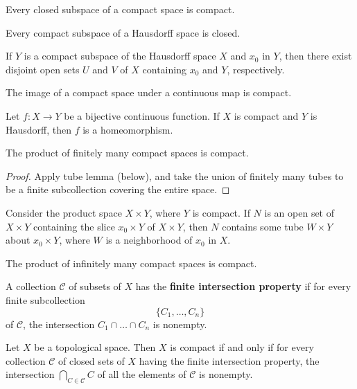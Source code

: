 \begin{theorem}
Every closed subspace of a compact space is compact.
\end{theorem}

\begin{theorem}
Every compact subspace of a Hausdorff space is closed.
\end{theorem}

\begin{lemma}
If $Y$ is a compact subspace of the Hausdorff space $X$ and $x_0$ in $Y$, then there exist disjoint open sets $U$ and $V$ of $X$ containing $x_0$ and $Y$, respectively. 
\end{lemma}

\begin{theorem}
The image of a compact space under a continuous map is compact.
\end{theorem}

\begin{theorem}
Let $f\colon X \rightarrow Y$ be a bijective continuous function. If $X$ is compact and $Y$ is Hausdorff, then $f$ is a homeomorphism.
\end{theorem}

\begin{theorem}
The product of finitely many compact spaces is compact.
\end{theorem}

\begin{proof}
Apply tube lemma (below), and take the union of finitely many tubes to be a finite subcollection covering the entire space.
\end{proof}

\begin{lemma}
Consider the product space $X \times Y$, where $Y$ is compact. If $N$ is an open set of $X \times Y$ containing the slice $x_0 \times Y$ of $X \times Y$, then $N$
contains some tube $W \times Y$ about $x_0 \times Y$, where $W$ is a neighborhood of $x_0$ in $X$.    
\end{lemma}

\begin{theorem}
The product of infinitely many compact spaces is compact.
\end{theorem}

\begin{definition}
A collection $\mathscr{C}$ of subsets of $X$ has the \textbf{finite intersection property} if for every finite subcollection 
\[
    \{ C_1, \dots, C_n \} 
\]
of $\mathscr{C}$, the intersection $C_1 \cap \dots \cap C_n$ is nonempty.
\end{definition}

\begin{theorem}
Let $X$ be a topological space. Then $X$ is compact if and only if for every collection $\mathscr{C}$ of closed sets of $X$ having the finite intersection property,
the intersection $\bigcap_{C \in \mathscr{C}} C$ of all the elements of $\mathscr{C}$ is nonempty.
\end{theorem}